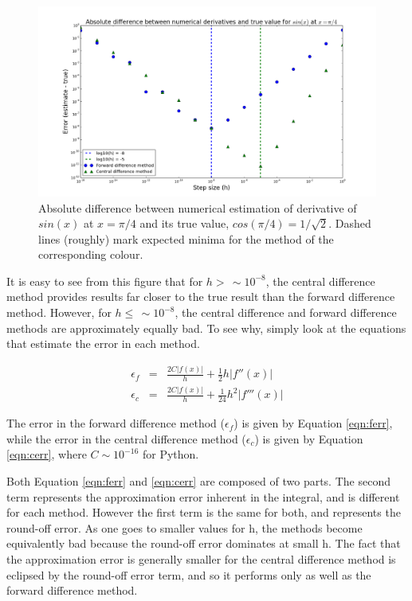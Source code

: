 \documentclass[a4paper,12pt]{article}
\begin{document}
\begin{figure}[H]
\centering
\includegraphics[width = \linewidth]{lab3q3.png}
\caption{Absolute difference between numerical estimation of derivative of $sin(x)$ at $x=\pi/4$ and its true value, $cos(\pi/4) = 1/\sqrt{2}$. Dashed lines (roughly) mark expected minima for the method of the corresponding colour.}
\label{fig:q3}
\end{figure}

It is easy to see from this figure that for $h >\,\sim 10^{-8}$, the central difference method provides results far closer to the true result than the forward difference method. However, for $h \leq\, \sim 10^{-8}$, the central difference and forward difference methods are approximately equally bad. To see why, simply look at the equations that estimate the error in each method.

\begin{eqnarray}
\label{eqn:ferr}
\epsilon_f &=& \frac{2C|f(x)|}{h} + \frac{1}{2}h|f''(x)|\\
\epsilon_c &=& \frac{2C|f(x)|}{h} + \frac{1}{24}h^2|f'''(x)|
\label{eqn:cerr}
\end{eqnarray}

The error in the forward difference method ($\epsilon_f$) is given by Equation \ref{eqn:ferr}, while the error in the central difference method ($\epsilon_c$) is given by Equation \ref{eqn:cerr}, where $C\sim10^{-16}$ for Python.

Both Equation \ref{eqn:ferr} and \ref{eqn:cerr} are composed of two parts. The second term represents the approximation error inherent in the integral, and is different for each method. However the first term is the same for both, and represents the round-off error. As one goes to smaller values for h, the methods become equivalently bad because the round-off error dominates at small h. The fact that the approximation error is generally smaller for the central difference method is eclipsed by the round-off error term, and so it performs only as well as the forward difference method.
\end{document}
